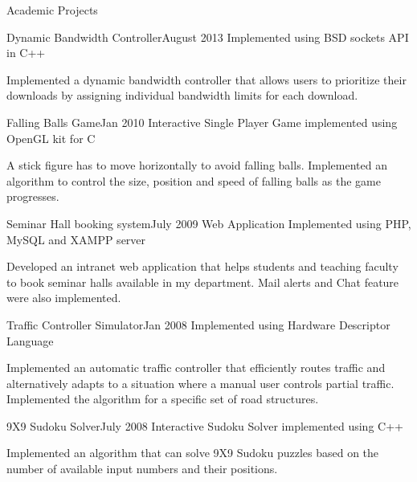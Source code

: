 \documentclass{resume} %
\begin{document}
\clearpage









\begin{rSection}{Academic Projects}

\begin{rSubsection}{Dynamic Bandwidth Controller}{August 2013}
{Implemented using BSD sockets API in C++}{}
\item Implemented a dynamic bandwidth controller that allows users to prioritize their downloads by assigning individual bandwidth limits for each download. 
\end{rSubsection}

\begin{rSubsection}{Falling Balls Game}{Jan 2010}
{Interactive Single Player Game implemented using OpenGL kit for C}{}
\item A stick figure has to move horizontally to avoid falling balls. Implemented an algorithm to control the size, position and speed of falling balls as the game progresses.
\end{rSubsection}


\begin{rSubsection}{Seminar Hall booking system}{July 2009}
{Web Application Implemented using PHP, MySQL and XAMPP server}{}
\item Developed an intranet web application that helps students and teaching faculty to book seminar halls available in my department. Mail alerts and Chat feature were also implemented. 
\end{rSubsection}

\begin{rSubsection}{Traffic Controller Simulator}{Jan 2008}
{Implemented using Hardware Descriptor Language}{}
\item Implemented an automatic traffic controller that efficiently routes traffic and alternatively adapts to a situation where a manual user controls partial traffic. Implemented the algorithm for a specific set of
road structures.
\end{rSubsection}

\begin{rSubsection}{9X9 Sudoku Solver}{July 2008}
{Interactive Sudoku Solver implemented using C++}{}
\item Implemented an algorithm that can solve 9X9 Sudoku puzzles based on the number of available input numbers and their positions.
\end{rSubsection}



\end{rSection}
\end{document}
